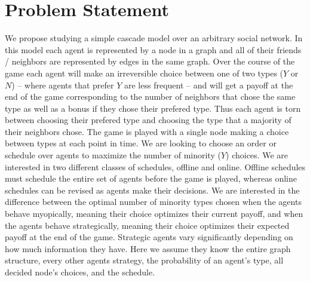 \documentclass{article}
\begin{document}
\section{Problem Statement}
\label{prob_statement}
We propose studying a simple cascade model over an arbitrary social network. In this model each agent is represented by a node in a graph and all of their friends / neighbors are represented by edges in the same graph. Over the course of the game each agent will make an irreversible choice between one of two types ($Y$ or $N$) -- where agents that prefer $Y$ are less frequent -- and will get a payoff at the end of the game corresponding to the number of neighbors that chose the same type as well as a bonus if they chose their prefered type. Thus each agent is torn between choosing their prefered type and choosing the type that a majority of their neighbors chose. The game is played with a single node making a choice between types at each point in time. We are looking to choose an order or schedule over agents to maximize the number of minority ($Y$) choices. We are interested in two different classes of schedules, offline and online. Offline schedules must schedule the entire set of agents before the game is played, whereas online schedules can be revised as agents make their decisions. We are interested in the difference between the optimal number of minority types chosen when the agents behave myopically, meaning their choice optimizes their current payoff, and when the agents behave strategically, meaning their choice optimizes their expected payoff at the end of the game. Strategic agents vary significantly depending on how much information they have. Here we assume they know the entire graph structure, every other agents strategy, the probability of an agent’s type, all decided node's choices, and the schedule.
\end{document}
